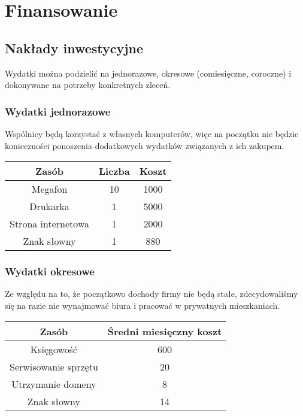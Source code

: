 \documentclass{article}
\begin{document}
\section{Finansowanie}
\subsection{Nakłady inwestycyjne}
Wydatki można podzielić na jednorazowe, okresowe (comiesięczne, coroczne) i dokonywane na potrzeby konkretnych zleceń.

\subsubsection{Wydatki jednorazowe}
Wspólnicy będą korzystać z własnych komputerów, więc na początku nie będzie konieczności ponoszenia dodatkowych wydatków związanych z ich zakupem.
\begin{table}[!ht]
\label{table2}
\vspace{0.3cm}
\hspace{-2cm}
\centering
\begin{tabular}{|c|c|c|}
\hline
Zasób & Liczba & Koszt \\
\hline
Megafon & 10 & 1000 \\
Drukarka & 1 & 5000 \\
Strona internetowa & 1 & 2000 \\
Znak słowny & 1 & 880 \\
\hline
\end{tabular}
\end{table}

\subsubsection{Wydatki okresowe}
Ze względu na to, że początkowo dochody firmy nie będą stałe, zdecydowaliśmy się na razie nie wynajmować biura i pracować w prywatnych mieszkaniach.

\begin{table}[!ht]
\label{table2}
\vspace{0.3cm}
\hspace{-2cm}
\centering
\begin{tabular}{|c|c|}
\hline
Zasób & Średni miesięczny koszt \\
\hline
Księgowość & 600 \\
Serwisowanie sprzętu & 20 \\
Utrzymanie domeny & 8 \\
Znak słowny & 14 \\
\hline
\end{tabular}
\end{table}
\end{document}
